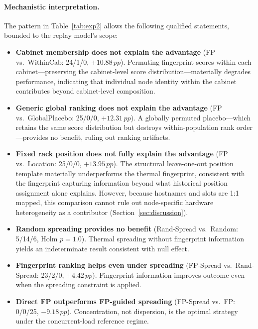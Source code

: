 \documentclass[acmsmall,screen,review,anonymous]{acmart}
\newcommand{\pp}{\,pp\xspace}
\begin{document}

\paragraph{Mechanistic interpretation.}
The pattern in Table~\ref{tab:exp2} allows the following qualified statements, bounded
to the replay model's scope:

\begin{itemize}
  \item \textbf{Cabinet membership does not explain the advantage} (FP vs.\ WithinCab:
    24/1/0, $+10.88\pp$).  Permuting fingerprint scores within each cabinet---preserving
    the cabinet-level score distribution---materially degrades performance, indicating
    that individual node identity within the cabinet contributes beyond cabinet-level
    composition.

  \item \textbf{Generic global ranking does not explain the advantage} (FP vs.\
    GlobalPlacebo: 25/0/0, $+12.31\pp$).  A globally permuted placebo---which retains
    the same score distribution but destroys within-population rank order---provides no
    benefit, ruling out ranking artifacts.

  \item \textbf{Fixed rack position does not fully explain the advantage} (FP vs.\
    Location: 25/0/0, $+13.95\pp$).  The structural leave-one-out position template
    materially underperforms the thermal fingerprint, consistent with the fingerprint
    capturing information beyond what historical position assignment alone explains.
    However, because hostnames and slots are 1:1 mapped, this comparison cannot rule
    out node-specific hardware heterogeneity as a contributor (Section~\ref{sec:discussion}).

  \item \textbf{Random spreading provides no benefit} (Rand-Spread vs.\ Random:
    5/14/6, Holm $p = 1.0$).  Thermal spreading without fingerprint information
    yields an indeterminate result consistent with null effect.

  \item \textbf{Fingerprint ranking helps even under spreading} (FP-Spread vs.\
    Rand-Spread: 23/2/0, $+4.42\pp$).  Fingerprint information improves outcome even
    when the spreading constraint is applied.

  \item \textbf{Direct FP outperforms FP-guided spreading} (FP-Spread vs.\ FP:
    0/0/25, $-9.18\pp$).  Concentration, not dispersion, is the optimal strategy under
    the concurrent-load reference regime.
\end{itemize}
\end{document}

